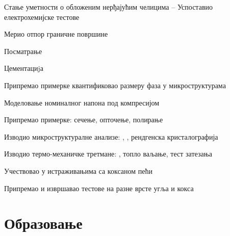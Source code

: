 \documentclass[11pt, a4paper, notitlepage]{article}
\begin{document}
	\begin{jobdetails}[OT2]
		\item Стање уметности о обложеним нерђајућим челицима – Успоставио електрохемијске тестове
		\item Мерио отпор граничне површине
		\item Посматрање 
	\end{jobdetails}

	\begin{jobdetails}[OT2]
		\item Цементациjа
		\item Припремао примерке квантификовао размеру фаза у микроструктурама
		\item Моделовање номиналног напона под компресијом
	\end{jobdetails}

	\begin{jobdetails}[OT2]
		\item Припремао примерке: сечење, опточење, полирање
		\item Изводио микроструктуралне анализе: , , рендгенска кристалографија
		\item Изводио термо-механичке третмане: , топло ваљање, тест затезања
	\end{jobdetails}

	\begin{jobdetails}[OT2]
		\item Учествовао у истраживањима са коксаном пећи
		\item Припремао и извршавао тестове на разне врсте угља и кокса
	\end{jobdetails}
	
	\newpage
	\section*{Образовање}
	
\end{document}
